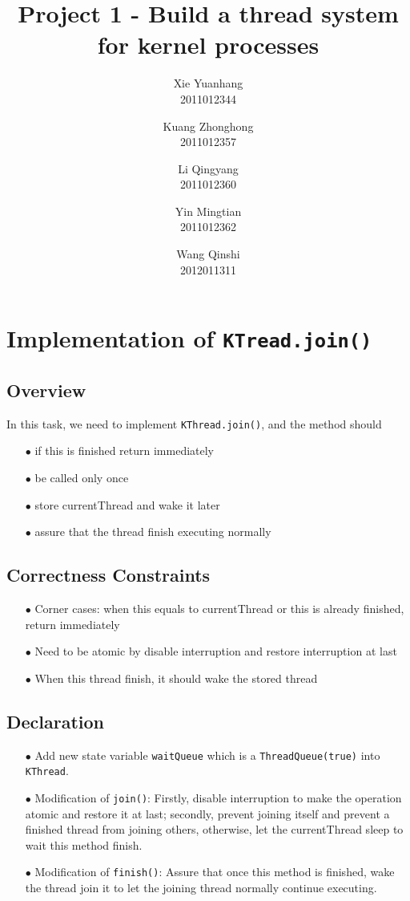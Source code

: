 \documentclass{article}
\title{Project 1 - Build a thread system for kernel processes}
\author{Xie Yuanhang\\ 2011012344\and
Kuang Zhonghong\\ 2011012357\and
Li Qingyang\\ 2011012360\and
Yin Mingtian\\ 2011012362\and
Wang Qinshi\\ 2012011311}
\date{}
\begin{document}
\maketitle
\tableofcontents{}
\section{Implementation of \texttt{KTread.join()}}
\subsection{Overview}
In this task, we need to implement \texttt{KThread.join()}, and the method should 
\begin{enumerate}
	\item[$\bullet$] if this is finished return immediately
	\item[$\bullet$] be called only once
	\item[$\bullet$] store currentThread and wake it later
	\item[$\bullet$] assure that the thread finish executing normally
\end{enumerate}
\subsection{Correctness Constraints}
\begin{enumerate}
	\item[$\bullet$] Corner cases: when this equals to currentThread or this is already finished, return immediately
	\item[$\bullet$] Need to be atomic by disable interruption and restore interruption at last
	\item[$\bullet$] When this thread finish, it should wake the stored thread
\end{enumerate}
\subsection{Declaration}
\begin{enumerate}
	\item[$\bullet$] Add new state variable \texttt{waitQueue} which is a \texttt{ThreadQueue(true)} into \texttt{KThread}.
	\item[$\bullet$] Modification of \texttt{join()}:
		Firstly, disable interruption to make the operation atomic and restore it at last; 
		secondly, prevent joining itself and prevent a finished thread from joining others, otherwise, let the currentThread sleep to wait this method finish.
	\item[$\bullet$] Modification of \texttt{finish()}:
		Assure that once this method is finished, wake the thread join it to let the joining thread normally continue executing.
\end{enumerate}
\end{document}
